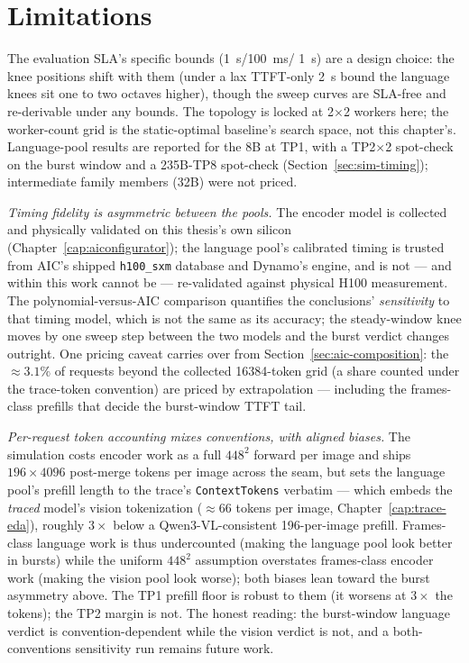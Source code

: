 \section{Limitations}
\label{sec:sim-limitations}

The evaluation SLA's specific bounds (\SI{1}{\second}/\SI{100}{\milli\second}/%
\SI{1}{\second}) are a design choice: the knee positions shift with them
(under a lax TTFT-only \SI{2}{\second} bound the language knees sit one to
two octaves higher), though the sweep curves are SLA-free and re-derivable
under any bounds. The topology is locked at 2$\times$2 workers here; the
worker-count grid is the static-optimal baseline's search space, not this
chapter's. Language-pool results are reported for the 8B at TP1, with
a TP2$\times$2 spot-check on the burst window and
a 235B-TP8 spot-check (Section~\ref{sec:sim-timing}); intermediate family
members (32B) were not priced.

\emph{Timing fidelity is asymmetric between the pools.} The encoder model
is collected and physically validated on this thesis's own silicon
(Chapter~\ref{cap:aiconfigurator}); the language pool's calibrated timing
is trusted from AIC's shipped \texttt{h100\_sxm} database and Dynamo's
engine, and is not --- and within this work cannot be --- re-validated
against physical H100 measurement. The polynomial-versus-AIC comparison
quantifies the conclusions' \emph{sensitivity} to that timing model, which
is not the same as its accuracy; the steady-window knee moves by one sweep
step between the two models and the burst verdict changes outright. One pricing caveat carries over from Section~\ref{sec:aic-composition}:
the ${\approx}3.1\%$ of requests beyond the collected \num{16384}-token
grid (a share counted under the trace-token convention) are priced by
extrapolation --- including the frames-class prefills that decide the
burst-window TTFT tail.

\emph{Per-request token accounting mixes conventions, with aligned
biases.} The simulation costs encoder work as a full $448^2$ forward per
image and ships $196 \times 4096$ post-merge tokens per image across the
seam, but sets the language pool's prefill length to the trace's
\texttt{ContextTokens} verbatim --- which embeds the \emph{traced}
model's vision tokenization (${\approx}66$ tokens per image,
Chapter~\ref{cap:trace-eda}), roughly $3\times$ below a
Qwen3-VL-consistent 196-per-image prefill. Frames-class language work is
thus undercounted (making the language pool look better in bursts) while the
uniform $448^2$ assumption overstates frames-class encoder work (making the
vision pool look worse); both biases lean toward the burst asymmetry above.
The TP1 prefill floor is robust to them (it worsens at $3\times$ the tokens);
the TP2 margin is not. The honest reading: the burst-window language verdict
is convention-dependent while the vision verdict is not, and a
both-conventions sensitivity run remains future work.

